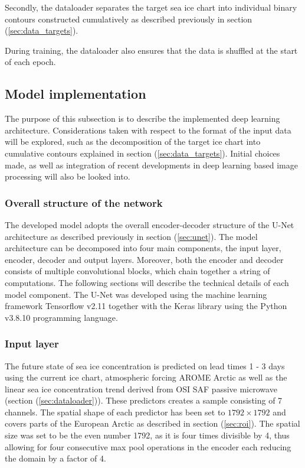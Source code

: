 \documentclass[../main/thesis]{subfiles}
\begin{document}
Secondly, the dataloader separates the target sea ice chart into individual binary contours constructed cumulatively as described previously in section (\ref{sec:data_targets}).

During training, the dataloader also ensures that the data is shuffled at the start of each epoch. 

\subsection{Model implementation}
\label{sec:implementation}
The purpose of this subsection is to describe the implemented deep learning architecture. Considerations taken with respect to the format of the input data will be explored, such as the decomposition of the target ice chart into cumulative contours explained in section (\ref{sec:data_targets}). Initial choices made, as well as integration of recent developments in deep learning based image processing will also be looked into. 

\subsubsection{Overall structure of the network}
The developed model adopts the overall encoder-decoder structure of the U-Net architecture as described previously in section (\ref{sec:unet}). The model architecture can be decomposed into four main components, the input layer, encoder, decoder and output layers. Moreover, both the encoder and decoder consists of multiple convolutional blocks, which chain together a string of computations. The following sections will describe the technical details of each model component. The U-Net was developed using the machine learning framework Tensorflow v2.11 \citep{tensorflow2015-whitepaper} together with the Keras library \citep{chollet2015keras} using the Python v3.8.10 programming language. 

\subsubsection{Input layer}
The future state of sea ice concentration is predicted on lead times 1 - 3 days using the current ice chart, atmospheric forcing AROME Arctic as well as the linear sea ice concentration trend derived from OSI SAF passive microwave (section (\ref{sec:dataloader})). These predictors creates a sample consisting of 7 channels. The spatial shape of each predictor has been set to $1792 \times 1792$ and covers parts of the European Arctic as described in section (\ref{sec:roi}). The spatial size was set to be the even number 1792, as it is four times divisible by 4, thus allowing for four consecutive max pool operations in the encoder \citep{Ronneberger2015} each reducing the domain by a factor of 4. 
\end{document}
